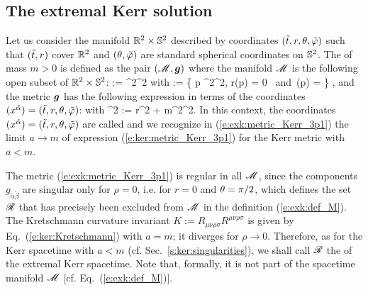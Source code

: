 \subsection{The extremal Kerr solution}

Let us consider the manifold $\mathbb{R}^2\times\mathbb{S}^2$ described by
coordinates $({\tilde t}, r, \theta,{\tilde\varphi})$ such that $({\tilde t},r)$ cover $\mathbb{R}^2$
and $(\theta,{\tilde\varphi})$ are standard spherical coordinates on $\mathbb{S}^2$.
The 
of mass $m>0$ is defined as the pair $(\mathscr{M}, \bm{g})$ where the manifold $\mathscr{M}$ is the following open subset of $\mathbb{R}^2\times\mathbb{S}^2$:
\be \label{e:exk:def_M}
 \M := \R^2\times\SS^2 \setminus \ring
\ee
with
\be \label{e:exk:def_ring}
    \ring := \left\{ p \in \R^2\times\SS^2,
        \quad r(p) = 0 \ \mbox{and}\ \th(p) =  \right\} ,
\ee
and the metric $\bm{g}$ has the following expression in terms of the coordinates
$(x^{\tilde{\alpha}}) = ({\tilde t}, r, \theta,{\tilde\varphi})$:
\be \label{e:exk:metric_Kerr_3p1}
\ee
with
\be
    \rho^2 := r^2 + m^2\cos^2\th .
\ee
In this context, the coordinates $(x^{\tilde{\alpha}}) = ({\tilde t}, r, \theta,{\tilde\varphi})$
are called
and we recognize in (\ref{e:exk:metric_Kerr_3p1}) the limit $a\to m$ of
expression (\ref{e:ker:metric_Kerr_3p1}) for the Kerr metric with $a< m$.

The metric (\ref{e:exk:metric_Kerr_3p1}) is regular
in all $\mathscr{M}$, since the components $g_{\tilde{\alpha}\tilde{\beta}}$ are singular only
for $\rho=0$, i.e. for $r=0$ and $\theta=\pi/2$, which defines  the set $\mathscr{R}$ that has precisely been excluded from $\mathscr{M}$ in
the definition (\ref{e:exk:def_M}). The Kretschmann curvature
invariant $K := R_{\mu\nu\rho\sigma} R^{\mu\nu\rho\sigma}$
is given by Eq.~(\ref{e:ker:Kretschmann}) with $a=m$; it diverges for $\rho\to 0$. Therefore, as
for the Kerr spacetime with $a<m$ (cf. Sec.~\ref{s:ker:singularities}), we shall call $\mathscr{R}$ the 
of the extremal Kerr spacetime. Note that, formally, it is not part of the spacetime manifold
$\mathscr{M}$ [cf. Eq.~(\ref{e:exk:def_M})].

